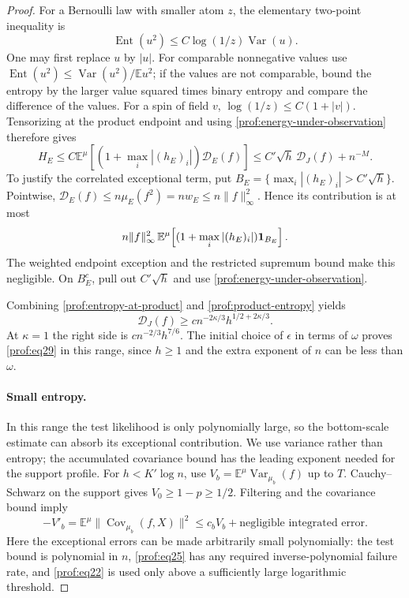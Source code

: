 \begin{proof}
For a Bernoulli law with smaller atom $z$, the elementary two-point
inequality is
\[
 \operatorname{Ent}(u^2)
       \le C\log(1/z)\operatorname{Var}(u).
\]
One may first replace $u$ by $|u|$.  For comparable nonnegative values use
$\operatorname{Ent}(u^2)\le\operatorname{Var}(u^2)/\mathbb E u^2$;
if the values are not comparable, bound the entropy by the larger value
squared times binary entropy and compare the difference of the values.
For a spin of field $v$, $\log(1/z)\le C(1+|v|)$.  Tensorizing at the
product endpoint and using \eqref{prof:energy-under-observation} therefore
gives
\begin{equation}
 H_E\le C\mathbb E^\mu\left[
       (1+\max_i|(h_E)_i|)\mathcal D_E(f)\right]
       \le C'\sqrt h\,\mathcal D_J(f)+n^{-M}.
 \label{prof:product-entropy}
\end{equation}
To justify the correlated exceptional term, put
\(B_E=\{\max_i|(h_E)_i|>C'\sqrt h\}\). Pointwise,
\(\mathcal D_E(f)\le n\mu_E(f^2)=nw_E\le n\|f\|_\infty^2\).
Hence its contribution is at most
\begin{equation}\label{prof:product-exception}
 n\|f\|_\infty^2\,
 \mathbb E^\mu\!\left[(1+\max_i|(h_E)_i|)\mathbf1_{B_E}\right].
\end{equation}
The weighted endpoint exception and the restricted supremum bound
make this negligible. On \(B_E^c\), pull out \(C'\sqrt h\) and
use \eqref{prof:energy-under-observation}.

Combining \eqref{prof:entropy-at-product} and
\eqref{prof:product-entropy} yields
\[
 \mathcal D_J(f)\ge c n^{-2\kappa/3}h^{1/2+2\kappa/3}.
\]
At $\kappa=1$ the right side is $c n^{-2/3}h^{7/6}$.
The initial choice of \(\epsilon\) in terms of \(\omega\) proves
\eqref{prof:eq29} in this range, since $h\ge1$ and the extra exponent of
$n$ can be less than $\omega$.

\paragraph{Small entropy.}

In this range the test likelihood is only polynomially large, so the
bottom-scale estimate can absorb its exceptional contribution. We use
variance rather than entropy; the accumulated covariance bound has the
leading exponent needed for the support profile.
For $h<K'\log n$, use
$V_b=\mathbb E^\mu\operatorname{Var}_{\mu_b}(f)$ up to $T$.
Cauchy--Schwarz on the support gives $V_0\ge1-p\ge1/2$.
Filtering and the covariance bound imply
\[
 -V'_b=\mathbb E^\mu
          \|\operatorname{Cov}_{\mu_b}(f,X)\|^2
       \le c_bV_b+\text{negligible integrated error}.
\]
Here the exceptional errors can be made arbitrarily small polynomially:
the test bound is polynomial in $n$, \eqref{prof:eq25} has any required
inverse-polynomial failure rate, and \eqref{prof:eq22} is used only above
a sufficiently large logarithmic threshold.


\end{proof}
